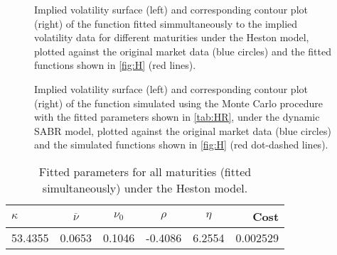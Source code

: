 \begin{figure}[H]
  \begin{subfigmatrix}{2}
  \end{subfigmatrix}
    \caption[Implied volatility surface and corresponding contour plot of the function fitted simmultaneously to the implied volatility data for different maturities under the Heston model, plotted against the original market data and the fitted functions shown in \autoref{fig:H}.]{Implied volatility surface (left) and corresponding contour plot (right) of the function fitted simmultaneously to the implied volatility data for different maturities under the Heston model, plotted against the original market data (blue circles) and the fitted functions shown in \autoref{fig:H} (red lines).}\label{fig:HS}
\end{figure}   



\begin{figure}[H]
  \begin{subfigmatrix}{2}
  \end{subfigmatrix}
    \caption[Implied volatility surface and corresponding contour plot of the function simulated using the Monte Carlo procedure with the fitted parameters shown in \autoref{tab:HR}, under the Heston model, plotted against the original market data and the simulated functions shown in \autoref{fig:H}.]{Implied volatility surface (left) and corresponding contour plot (right) of the function simulated using the Monte Carlo procedure with the fitted parameters shown in \autoref{tab:HR}, under the dynamic SABR model, plotted against the original market data (blue circles) and the simulated functions shown in \autoref{fig:H} (red dot-dashed lines).}\label{fig:HSSim}
\end{figure} 



\begin{table}[H]
    \centering
        \renewcommand{\arraystretch}{0.8}
\begin{tabular}{@{}lccccr@{}}
\toprule
$\kappa$ & $\overline{\nu}$ & $\nu_0$ & $\rho$ & $\eta$ & Cost \\ \midrule
53.4355 & 0.0653 & 0.1046 & -0.4086 & 6.2554 & 0.002529 \\
\bottomrule
\end{tabular}
  \caption[Fitted parameters for all maturities (fitted simultaneously) under the Heston model.]{Fitted parameters for all maturities (fitted simultaneously) under the Heston model.}
  \label{tab:HR}
\end{table}


